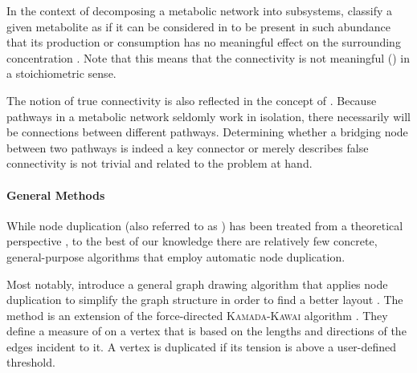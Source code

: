 \documentclass[
	fontsize=10pt, %
	twoside=false, %
	secnumdepth=1, %
  toc=indentunnumbered %
]{kaobook}
\begin{document}
In the context of decomposing a metabolic network into subsystems,
\citeauthor{schuster_exploring_2002} classify a given metabolite as
 if it can be considered in to be present in such abundance that
its production or consumption has no meaningful effect on the surrounding
concentration
\cite{schuster_exploring_2002}.
Note that this means that the connectivity is not meaningful
() in a stoichiometric sense. 

The notion of true connectivity is also reflected in the concept of  \cite{kim_IdentificationCriticalConnectors_2019}. Because pathways
in a metabolic network seldomly work in isolation, there necessarily will be
connections between different pathways. Determining whether a bridging node
between two pathways is indeed a key connector or merely describes false
connectivity is not trivial and related to the problem at hand.

\paragraph{General Methods} While node duplication (also referred to as
) has been treated from a theoretical perspective
\cite{liebers_PlanarizingGraphsSurvey_2001,abu-khzam_ClusterEditingVertex_2018},
to the best of our knowledge there are relatively few concrete, general-purpose
algorithms that employ automatic node duplication.

Most notably, \citeauthor{eades_VertexSplittingTensionfree_1996} introduce a
general graph drawing algorithm that applies node duplication to simplify the
graph structure in order to find a better layout
\cite{eades_VertexSplittingTensionfree_1996}. The method is an extension of the
force-directed \textsc{Kamada-Kawai} algorithm
\cite{kamada_AlgorithmDrawingGeneral_1989}. They define a measure of
 on a vertex that is based on the lengths and directions of the
edges incident to it. A vertex is duplicated if its tension is above a
user-defined threshold.
\end{document}
